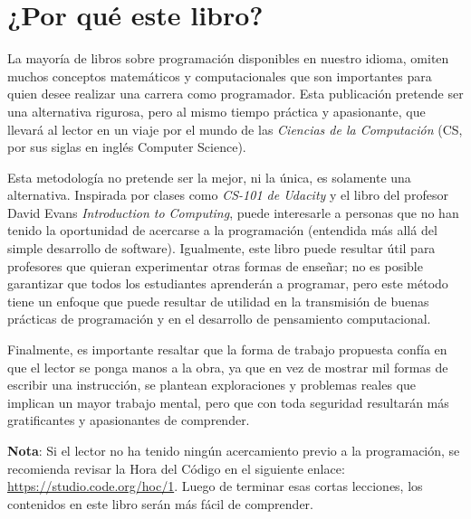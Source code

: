 \thispagestyle{empty}

\chapter{¿Por qué este libro?}
    La mayoría de libros sobre programación disponibles en nuestro idioma, omiten muchos conceptos matemáticos y computacionales que son importantes para quien desee realizar una carrera como programador. Esta publicación pretende ser una alternativa rigurosa, pero al mismo tiempo práctica y apasionante, que llevará al lector en un viaje por el mundo de las \emph{Ciencias de la Computación} (CS, por sus siglas en inglés Computer Science).    
    
    Esta metodología no pretende ser la mejor, ni la única, es solamente una alternativa. Inspirada por clases como \emph{CS-101 de Udacity} y el libro del profesor David Evans \emph{Introduction to Computing}, puede interesarle a personas que no han tenido la oportunidad de acercarse a la programación (entendida más allá del simple desarrollo de software). Igualmente, este libro puede resultar útil para profesores que quieran experimentar otras formas de enseñar; no es posible  garantizar que todos los estudiantes aprenderán a programar, pero este método tiene un enfoque que puede resultar de utilidad en la transmisión de buenas prácticas de programación y en el desarrollo de pensamiento computacional.
    
    Finalmente, es importante resaltar que la forma de trabajo propuesta confía en que el lector se ponga manos a la obra, ya que en vez de mostrar mil formas de escribir una instrucción,  se plantean exploraciones y problemas reales que implican un mayor trabajo mental, pero que con toda seguridad resultarán más gratificantes y apasionantes de comprender.
     
    \newpage
    \thispagestyle{empty}
        \textbf{Nota}: Si el lector no ha tenido ningún acercamiento previo a la programación, se recomienda revisar la Hora del Código en el siguiente enlace: \url{https://studio.code.org/hoc/1}. Luego de terminar esas cortas lecciones, los contenidos en este libro serán más fácil de comprender.
      
    
  
    
 